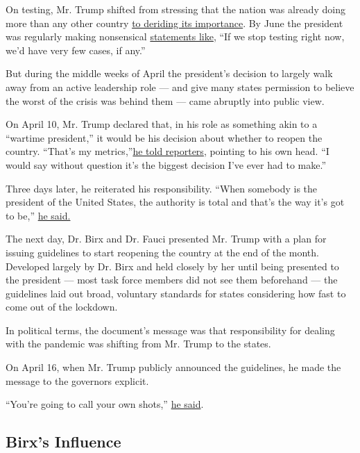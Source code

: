 On testing, Mr. Trump shifted from stressing that the nation was already
doing more than any other country
\href{https://www.politico.com/news/2020/05/14/trump-coronavirus-testing-high-case-numbers-259524}{to
deriding its importance}. By June the president was regularly making
nonsensical
\href{https://www.youtube.com/watch?v=aN1eptTaWVM}{statements like},
``If we stop testing right now, we'd have very few cases, if any.''

But during the middle weeks of April the president's decision to largely
walk away from an active leadership role --- and give many states
permission to believe the worst of the crisis was behind them --- came
abruptly into public view.

On April 10, Mr. Trump declared that, in his role as something akin to a
``wartime president,'' it would be his decision about whether to reopen
the country. ``That's my
metrics,''\href{https://www.whitehouse.gov/briefings-statements/remarks-president-trump-vice-president-pence-members-coronavirus-task-force-press-briefing-24/}{he
told reporters}, pointing to his own head. ``I would say without
question it's the biggest decision I've ever had to make.''

Three days later, he reiterated his responsibility. ``When somebody is
the president of the United States, the authority is total and that's
the way it's got to be,''
\href{https://www.whitehouse.gov/briefings-statements/remarks-president-trump-vice-president-pence-members-coronavirus-task-force-press-briefing-25/}{he
said.}

The next day, Dr. Birx and Dr. Fauci presented Mr. Trump with a plan for
issuing guidelines to start reopening the country at the end of the
month. Developed largely by Dr. Birx and held closely by her until being
presented to the president --- most task force members did not see them
beforehand --- the guidelines laid out broad, voluntary standards for
states considering how fast to come out of the lockdown.

In political terms, the document's message was that responsibility for
dealing with the pandemic was shifting from Mr. Trump to the states.

On April 16, when Mr. Trump publicly announced the guidelines, he made
the message to the governors explicit.

``You're going to call your own shots,''
\href{https://www.nytimes.com/2020/04/16/us/politics/coronavirus-trump-guidelines.html}{he
said}.

\hypertarget{birxs-influence}{%
\subsection{Birx's Influence}\label{birxs-influence}}

